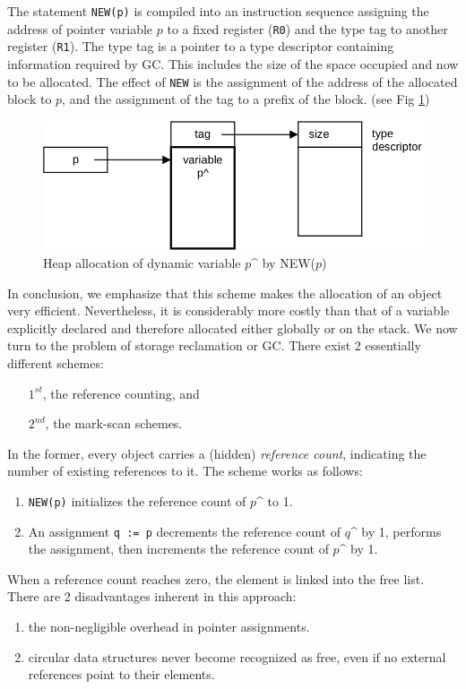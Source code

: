 The statement \verb|NEW(p)| is compiled into an instruction sequence assigning the address
of pointer variable $p$ to a fixed register (\verb|R0|) and the type tag to another register
(\verb|R1|). The type tag is a pointer to a type descriptor containing information required
by GC. This includes the size of the space occupied and now to be allocated. The effect of
\verb|NEW| is the assignment of the address of the allocated block to $p$, and the assignment
of the tag to a prefix of the block. (see Fig \ref{fig:allocation})
\begin{figure}[h!]
  \label{fig:allocation}
  \centering
  \includegraphics[width=\textwidth]{i/r}
  \caption{Heap allocation of dynamic variable $p$\^{} by NEW($p$)}
\end{figure}

In conclusion, we emphasize that this scheme makes the allocation of an object very efficient.
Nevertheless, it is considerably more costly than that of a variable explicitly declared
and therefore allocated either globally or on the stack. We now turn to the problem of
storage reclamation or GC. There exist 2 essentially different schemes:
\begin{itemize}
  \item[$1^{st}$,] the reference counting, and
  \item[$2^{nd}$,] the mark-scan schemes.
\end{itemize}
In the former, every object carries a (hidden) \emph{reference count}, indicating the number
of existing references to it. The scheme works as follows:
\begin{enumerate}
  \item \verb|NEW(p)| initializes the reference count of $p$\^{} to 1.
  \item An assignment \verb|q := p| decrements the reference count of $q$\^{} by 1, performs
    the assignment, then increments the reference count of $p$\^{} by 1.
\end{enumerate}
When a reference count reaches zero, the element is linked into the free list. There are 2
disadvantages inherent in this approach:
\begin{enumerate}
  \item the non-negligible overhead in pointer assignments.
  \item circular data structures never become recognized as free,
    even if no external references point to their elements.
\end{enumerate}

